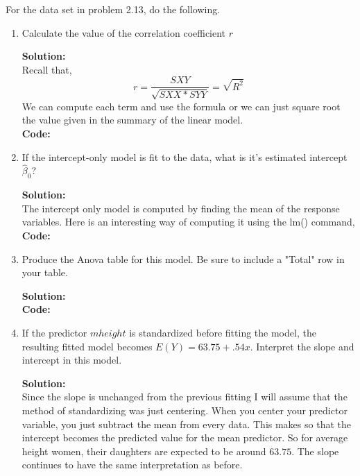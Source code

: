 \documentclass[12pt]{article}
\makeatletter
\theoremstyle{homework}
\newenvironment{exercise}[1]
{\def\@currentlabel{#1}\exercisecore}
{\endexercisecore}
\newcommand{\localhead}[1]{\par\smallskip\noindent\textbf{#1}\nobreak\\}%
\newcommand\solution{\localhead{Solution:}}
\makeatother
\begin{document}
\begin{exercise}{4} For the data set in problem 2.13, do the following.
  \begin{enumerate}
    \item Calculate the value of the correlation coefficient $r$
    \solution Recall that, 
    \begin{equation*}
      r = \dfrac{SXY}{\sqrt{SXX*SYY}} = \sqrt{R^2}
    \end{equation*}
    We can compute each term and use the formula or we can just square root the 
    value given in the summary of the linear model.\\
    \textbf{Code:}
    \begin{center}
    
    \end{center}
    \newpage

    \item If the intercept-only model is fit to the data, what is it's estimated intercept 
    $\hat{\beta}_0$?\\
    \solution The intercept only model is computed by finding the mean of the response variables.
    Here is an interesting way of computing it using the lm() command, \\
    \textbf{Code:}
    \begin{center}
    
    \end{center}
    \newpage

    \item Produce the Anova table for this model. Be sure to include a "Total" row in your table. \\
    \solution
    \textbf{Code:}
    \begin{center}
    
    \end{center}
    \newpage

    \item If the predictor $mheight$ is standardized before fitting the model, the resulting fitted 
    model becomes $E(Y) = 63.75 + .54x$. Interpret the slope and intercept in this model.\\
    \solution Since the slope is unchanged from the previous fitting I will assume that the method of standardizing
    was just centering. When you center your predictor variable, you just subtract the mean from every data. This makes so
    that the intercept becomes the predicted value for the mean predictor. So for average height women, their daughters are expected to 
    be around $63.75$. The slope continues to have the same interpretation as before. 
  \end{enumerate}
  
\end{exercise}
\end{document}
